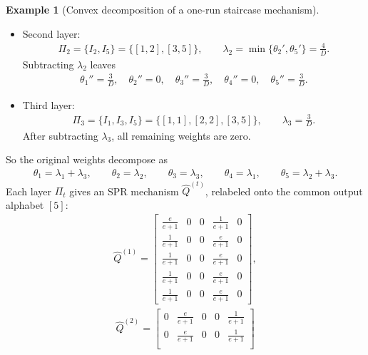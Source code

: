 \documentclass{article}
\theoremstyle{plain}
\theoremstyle{definition}
\newtheorem{example}[theorem]{Example}
\theoremstyle{plain}
\begin{document}
\begin{example}[Convex decomposition of a one-run staircase mechanism]
\begin{itemize}
\begin{align*}
    \lambda_1=\min\{\theta_1,\theta_4\}=\frac7D.
\end{align*}
Subtracting \(\lambda_1\) leaves
\begin{align*}
    \theta_1'=\frac3D,\quad
    \theta_2'=\frac4D,\quad
    \theta_3'=\frac3D,\quad
    \theta_4'=0,\quad
    \theta_5'=\frac7D.
\end{align*}
\item Second layer:
\begin{align*}
    \Pi_2=\{I_2,I_5\}=\{[1,2],[3,5]\},
    \qquad
    \lambda_2=\min\{\theta_2',\theta_5'\}=\frac4D.
\end{align*}
Subtracting \(\lambda_2\) leaves
\begin{align*}
    \theta_1''=\frac3D,\quad
    \theta_2''=0,\quad
    \theta_3''=\frac3D,\quad
    \theta_4''=0,\quad
    \theta_5''=\frac3D.
\end{align*}
\item Third layer:
\begin{align*}
    \Pi_3=\{I_1,I_3,I_5\}=\{[1,1],[2,2],[3,5]\},
    \qquad
    \lambda_3=\frac3D.
\end{align*}
After subtracting \(\lambda_3\), all remaining weights are zero.
\end{itemize}
So the original weights decompose as
\begin{align*}
    \theta_1=\lambda_1+\lambda_3,\qquad
    \theta_2=\lambda_2,\qquad
    \theta_3=\lambda_3,\qquad
    \theta_4=\lambda_1,\qquad
    \theta_5=\lambda_2+\lambda_3.
\end{align*}
Each layer \(\Pi_t\) gives an SPR mechanism \(\widehat Q^{(t)}\), relabeled onto the common output alphabet \([5]\):
\begin{align*}
    \widehat Q^{(1)}=
    \begin{bmatrix}
    \frac{e}{e+1} & 0 & 0 & \frac1{e+1} & 0\\[4pt]
    \frac1{e+1} & 0 & 0 & \frac{e}{e+1} & 0\\
    \frac1{e+1} & 0 & 0 & \frac{e}{e+1} & 0\\
    \frac1{e+1} & 0 & 0 & \frac{e}{e+1} & 0\\
    \frac1{e+1} & 0 & 0 & \frac{e}{e+1} & 0
    \end{bmatrix},
\end{align*}
\begin{align*}
    \widehat Q^{(2)}=
    \begin{bmatrix}
    0 & \frac{e}{e+1} & 0 & 0 & \frac1{e+1}\\[4pt]
    0 & \frac{e}{e+1} & 0 & 0 & \frac1{e+1}\\

\end{bmatrix}
\end{align*}
\end{example}
\end{document}
